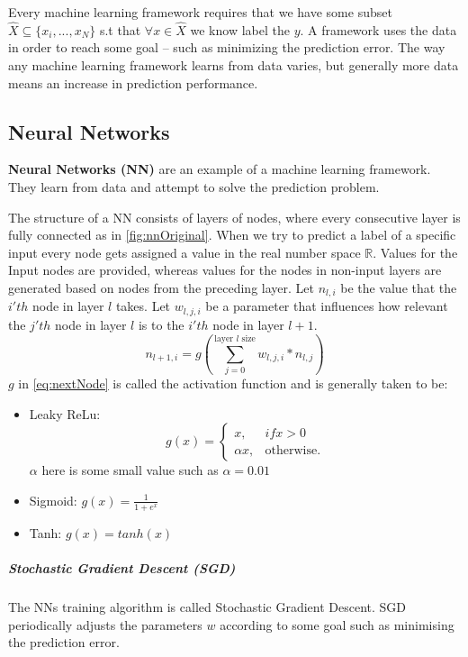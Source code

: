 \documentclass[dissertation.tex]{subfiles}
\begin{document}
Every machine learning framework requires that we have some subset
$\hat{X}\subseteq\{x_i,...,x_N\}$ s.t that $ \forall x\in\hat{X}$ we know label
the $y$. A framework uses the data in order to reach some goal -- such as
minimizing the prediction error. The way any machine learning framework learns
from data varies, but generally more data means an increase in prediction
performance.

\subsection{Neural Networks} 

\textbf{Neural Networks (NN)} are an example of a machine learning framework. They learn
from data and attempt to solve the prediction problem.

The structure of a NN consists of layers of nodes, where every consecutive
layer is fully connected as in \autoref{fig:nnOriginal}.  When we try to
predict a label of a specific input every node gets assigned a value in the
real number space $\mathbb{R}$. Values for the Input nodes are provided,
whereas values for the nodes in non-input layers are generated based on nodes
from the preceding layer. Let $n_{l,i}$ be the value that the $i'th$ node in
layer $l$ takes. Let $w_{l,j,i}$ be a parameter that influences how relevant
the $j'th$ node in layer $l$ is to the $i'th$ node in layer $l+1$.
\begin{equation}
  n_{l+1,i} = g(\sum_{j = 0}^{\text{layer }l\text{ size}} w_{l,j,i}*n_{l,j})
  \label{eq:nextNode}
\end{equation}
$g$ in \autoref{eq:nextNode} is called the activation function and is generally 
taken to be:
\begin{itemize}
  \item{
      Leaky ReLu: 
      \begin{equation*}
        g(x) = \begin{cases}
          x, & if x > 0 \\
          \alpha{x}, & \text{otherwise}.
        \end{cases}
      \end{equation*}
      $\alpha$ here is some small value such as $\alpha = 0.01$
    }
  \item{
      Sigmoid: $g(x) = \frac{1}{1+e^x}$
    }
  \item{
      Tanh: $g(x) = tanh(x)$
    }
\end{itemize}


\subparagraph{Stochastic Gradient Descent (SGD)} The NNs training algorithm is
called Stochastic Gradient Descent. SGD periodically adjusts the parameters $w$
according to some goal such as minimising the prediction error. 
\end{document}
